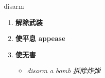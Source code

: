 
\begin{frame}
{\huge disarm}
\begin{center}
\begin{enumerate}\Large
  \item \textbf{解除武装}
  \item \textbf{使平息 appease}
  \item \textbf{使无害}
  \begin{itemize}
    \item \em{\Large{disarm a bomb 拆除炸弹}}
  \end{itemize}
\end{enumerate}
\end{center}
\end{frame}
